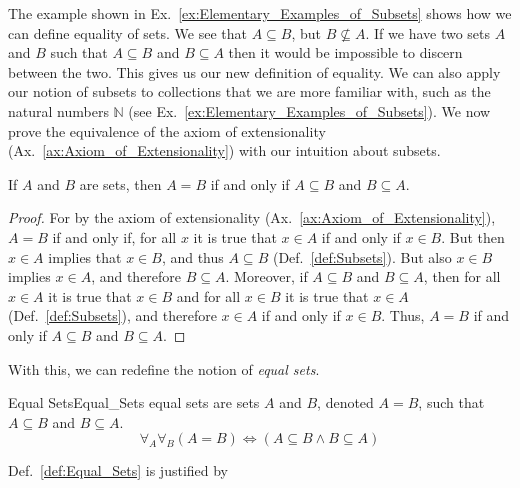         The example shown in Ex.~\ref{ex:Elementary_Examples_of_Subsets} shows
        how we can define equality of sets. We see that $A\subseteq{B}$, but
        $B\nsubseteq{A}$. If we have two sets $A$ and $B$ such that
        $A\subseteq{B}$ and $B\subseteq{A}$ then it would be impossible to
        discern between the two. This gives us our new definition of equality.
        We can also apply our notion of subsets to collections that we are more
        familiar with, such as the natural numbers $\mathbb{N}$
        (see Ex.~\ref{ex:Elementary_Examples_of_Subsets}). We now prove the
        equivalence of the axiom of extensionality%
         (Ax.~\ref{ax:Axiom_of_Extensionality})
        with our intuition about subsets.
        \begin{theorem}
            \label{thm:Equivalent_Def_of_Equality}%
            If $A$ and $B$ are sets, then $A=B$ if and only if $A\subseteq{B}$
            and $B\subseteq{A}$.
        \end{theorem}
        \begin{proof}
            For by the axiom of extensionality
            (Ax.~\ref{ax:Axiom_of_Extensionality}), $A=B$ if and only if, for
            all $x$ it is true that $x\in{A}$ if and only if $x\in{B}$. But then
            $x\in{A}$ implies that $x\in{B}$, and thus $A\subseteq{B}$
            (Def.~\ref{def:Subsets}). But also $x\in{B}$ implies $x\in{A}$, and
            therefore $B\subseteq{A}$. Moreover, if $A\subseteq{B}$ and
            $B\subseteq{A}$, then for all $x\in{A}$ it is true that $x\in{B}$
            and for all $x\in{B}$ it is true that $x\in{A}$
            (Def.~\ref{def:Subsets}), and therefore $x\in{A}$ if and only if
            $x\in{B}$. Thus, $A=B$ if and only if $A\subseteq{B}$ and
            $B\subseteq{A}$.
        \end{proof}
        With this, we can redefine the notion of
        \textit{equal sets}.
        \begin{fdefinition}{Equal Sets}{Equal_Sets}
            \Glspl{equal set} are \glspl{set} $A$ and $B$, denoted $A=B$, such
            that $A\subseteq{B}$ and $B\subseteq{A}$.
            \begin{equation*}
                \forall_{A}\forall_{B}(A=B)
                \Leftrightarrow
                (A\subseteq{B}\land{B}\subseteq{A})
            \end{equation*}
        \end{fdefinition}
        Def.~\ref{def:Equal_Sets} is justified by
